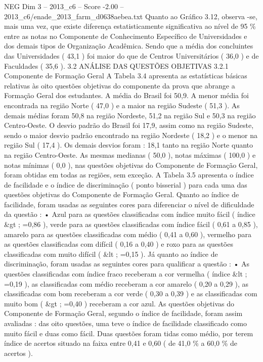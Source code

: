 \begin{textsample}{NEG Dim 3 – 2013\_c6 – Score -2.00 – 2013\_c6/enade\_2013\_farm\_d0638aebea.txt}
Quanto ao Gráfico 3.12, observa -se, mais uma vez, que existe diferença estatisticamente significativa ao nível de 95 \% entre as notas no Componente de Conhecimento Específico de Universidades e dos demais tipos de Organização Acadêmica.
Sendo que a média dos concluintes das Universidades ( 43,1 ) foi maior do que de Centros Universitários ( 36,0 ) e de Faculdades ( 35,6 ). 3.2 ANÁLISE DAS QUESTÕES OBJETIVAS 3.2.1 Componente de Formação Geral A Tabela 3.4 apresenta as estatísticas básicas relativas às oito questões objetivas do componente da prova que abrange a Formação Geral dos estudantes.
A média do Brasil foi 50,9.
A menor média foi encontrada na região Norte ( 47,0 ) e a maior na região Sudeste ( 51,3 ).
As demais médias foram 50,8 na região Nordeste, 51,2 na região Sul e 50,3 na região Centro-Oeste.
O desvio padrão do Brasil foi 17,9, assim como na região Sudeste, sendo o maior desvio padrão encontrado na região Nordeste ( 18,2 ) e o menor na região Sul ( 17,4 ).
Os demais desvios foram : 18,1 tanto na região Norte quanto na região Centro-Oeste.
As mesmas medianas ( 50,0 ), notas máximas ( 100,0 ) e notas mínimas ( 0,0 ), nas questões objetivas do Componente de Formação Geral, foram obtidas em todas as regiões, sem exceção.
A Tabela 3.5 apresenta o índice de facilidade e o índice de discriminação ( ponto bisserial ) para cada uma das questões objetivas do Componente de Formação Geral.
Quanto ao índice de facilidade, foram usadas as seguintes cores para diferenciar o nível de dificuldade da questão : • Azul para as questões classificadas com índice muito fácil ( índice \&gt ; =0,86 ), verde para as questões classificadas com índice fácil ( 0,61 a 0,85 ), amarelo para as questões classificadas com médio ( 0,41 a 0,60 ), vermelho para as questões classificadas com difícil ( 0,16 a 0,40 ) e roxo para as questões classificadas com muito difícil ( \&lt ; =0,15 ).
Já quanto ao índice de discriminação, foram usadas as seguintes cores para qualificar a questão : • As questões classificadas com índice fraco receberam a cor vermelha ( índice \&lt ; =0,19 ), as classificadas com médio receberam a cor amarelo ( 0,20 a 0,29 ), as classificadas com bom receberam a cor verde ( 0,30 a 0,39 ) e as classificadas com muito bom ( \&gt ; =0,40 ) receberam a cor azul.
As questões objetivas do Componente de Formação Geral, segundo o índice de facilidade, foram assim avaliadas : das oito questões, uma teve o índice de facilidade classificado como muito fácil e duas como fácil.
Duas questões foram tidas como médio, por terem índice de acertos situado na faixa entre 0,41 e 0,60 ( de 41,0 \% a 60,0 \% de acertos ).

\end{textsample}
